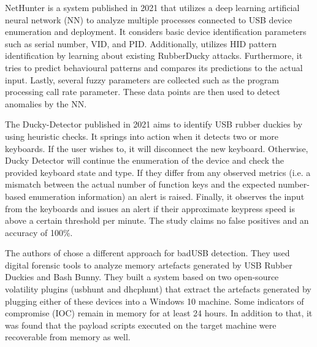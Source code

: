 NetHunter \cite{IntelligentSystemPreventing} is a system published in 2021 that utilizes a deep learning artificial neural network (NN) to analyze multiple processes connected to USB device enumeration and deployment. It considers basic device identification parameters such as serial number, VID, and PID. Additionally, utilizes HID pattern identification by learning about existing RubberDucky attacks. Furthermore, it tries to predict behavioural patterns and compares its predictions to the actual input. Lastly, several fuzzy parameters are collected such as the program processing call rate parameter. These data points are then used to detect anomalies by the NN.


The Ducky-Detector \cite{USBRubberDucky2021} published in 2021 aims to identify USB rubber duckies by using heuristic checks. It springs into action when it detects two or more keyboards. If the user wishes to, it will disconnect the new keyboard. Otherwise, Ducky Detector will continue the enumeration of the device and check the provided keyboard state and type. If they differ from any observed metrics (i.e. a mismatch between the actual number of function keys and the expected number-based enumeration information) an alert is raised. Finally, it observes the input from the keyboards and issues an alert if their approximate keypress speed is above a certain threshold per minute. The study claims no false positives and an accuracy of 100\%. 

The authors of \cite{thomasDuckHuntMemory2021} chose a different approach for badUSB detection. They used digital forensic tools to analyze memory artefacts generated by USB Rubber Duckies and Bash Bunny. They built a system based on two open-source volatility plugins (usbhunt and dhcphunt) that extract the artefacts generated by plugging either of these devices into a Windows 10 machine. Some indicators of compromise (IOC) remain in memory for at least 24 hours. In addition to that, it was found that the payload scripts executed on the target machine were recoverable from memory as well. 


